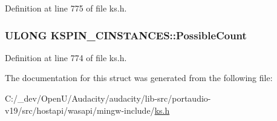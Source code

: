 Definition at line 775 of file ks.\+h.

\subsubsection[{\texorpdfstring{Possible\+Count}{PossibleCount}}]{\setlength{\rightskip}{0pt plus 5cm}U\+L\+O\+NG K\+S\+P\+I\+N\+\_\+\+C\+I\+N\+S\+T\+A\+N\+C\+E\+S\+::\+Possible\+Count}\hypertarget{struct_k_s_p_i_n___c_i_n_s_t_a_n_c_e_s_ad520ef055d9c8a1cf8ea529c64e8e2a2}{}\label{struct_k_s_p_i_n___c_i_n_s_t_a_n_c_e_s_ad520ef055d9c8a1cf8ea529c64e8e2a2}


Definition at line 774 of file ks.\+h.



The documentation for this struct was generated from the following file\+:\begin{DoxyCompactItemize}
\item 
C\+:/\+\_\+dev/\+Open\+U/\+Audacity/audacity/lib-\/src/portaudio-\/v19/src/hostapi/wasapi/mingw-\/include/\hyperlink{ks_8h}{ks.\+h}\end{DoxyCompactItemize}
